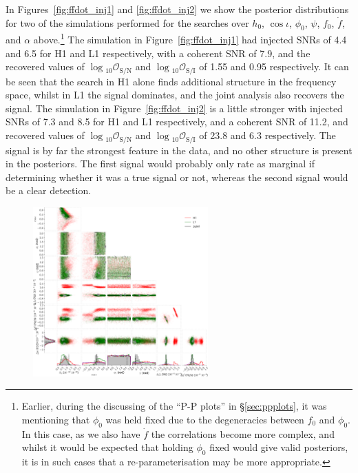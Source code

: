 In Figures~\ref{fig:ffdot_inj1} and \ref{fig:ffdot_inj2} we show the posterior distributions for two of the simulations performed for the searches over
$h_0$, $\cos{\iota}$, $\phi_0$, $\psi$, $f_0$, $\dot{f}$, and $\alpha$ above.\footnote{Earlier, during the discussing of the ``P-P plots'' in \S\ref{sec:ppplots},
it was mentioning that $\phi_0$ was held fixed due to the degeneracies between $f_0$ and $\phi_0$. In this case, as we also have $\dot{f}$ the correlations
become more complex, and whilst it would be expected that holding $\phi_0$ fixed would give valid posteriors, it is in such cases that a re-parameterisation
may be more appropriate.} The simulation in Figure~\ref{fig:ffdot_inj1} had injected SNRs of 4.4 and 6.5 for H1
and L1 respectively, with a coherent SNR of 7.9, and the recovered values of $\log{}_{10}\mathcal{O}_{\text{S}/\text{N}}$ and
$\log{}_{10}\mathcal{O}_{\text{S}/\text{I}}$ of 1.55 and 0.95 respectively. It can be seen that the search in H1 alone finds additional structure
in the frequency space, whilst in L1 the signal dominates, and the joint analysis also recovers the signal. The simulation in Figure~\ref{fig:ffdot_inj2}
is a little stronger with injected SNRs of 7.3 and 8.5 for H1 and L1 respectively, and a coherent SNR of 11.2, and recovered values of 
$\log{}_{10}\mathcal{O}_{\text{S}/\text{N}}$ and $\log{}_{10}\mathcal{O}_{\text{S}/\text{I}}$ of 23.8 and 6.3 respectively. The signal is by far the strongest
feature in the data, and no other structure is present in the posteriors. The first signal would probably only rate as marginal if determining whether it was
a true signal or not, whereas the second signal would be a clear detection.

\begin{figure}[!phtb]
\begin{center}
\includegraphics[width=0.6\textwidth]{./figures/codeeval/simulations/signal_freq/one/ffdot_inj1}
\caption{ \protect}
\end{center}
\end{figure}


